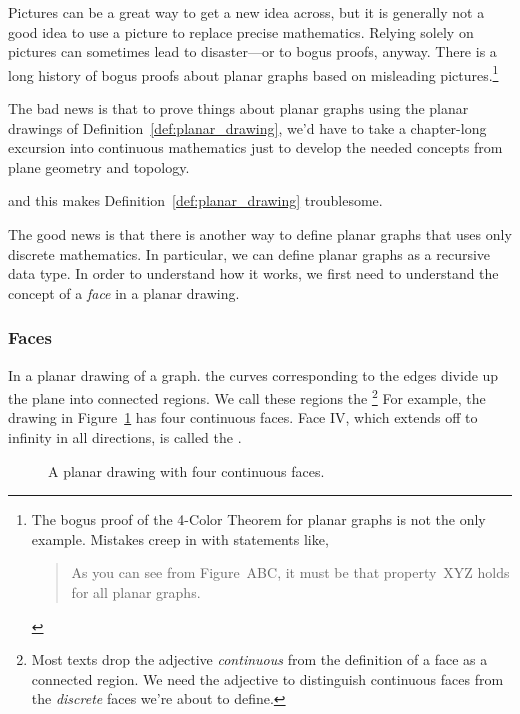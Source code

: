 Pictures can be a great way to get a new idea across, but it is generally
not a good idea to use a picture to replace precise mathematics.  Relying
solely on pictures can sometimes lead to disaster---or to bogus proofs,
anyway.  There is a long history of bogus proofs about planar graphs based
on misleading pictures.\footnote{The bogus proof of the
  4-Color Theorem for planar graphs is not the only example.  Mistakes
  creep in with statements like,
\begin{quote}
    As you can see from Figure~ABC, it must be that property~XYZ holds
    for all planar graphs.
\end{quote}}

The bad news is that to prove things about planar graphs using the planar
drawings of Definition~\ref{def:planar_drawing}, we'd have to take a chapter-long
excursion into continuous mathematics just to develop the needed concepts
from plane geometry and topology.
\begin{editingnotes} and this makes
  Definition~\ref{def:planar_drawing} troublesome.
\end{editingnotes}
The good news is that there is another way to define planar graphs that
uses only discrete mathematics.  In particular, we can define planar
graphs as a recursive data type.  In order to understand how it works, we
first need to understand the concept of a \emph{face} in a planar drawing.

\subsubsection{Faces}

In a planar drawing of a graph. the curves corresponding to the edges
divide up the plane into connected regions.  We call these regions the
\footnote{Most texts drop the adjective
  \emph{continuous} from the definition of a face as a connected region.
  We need the adjective to distinguish continuous faces from the
  \emph{discrete} faces we're about to define.}  For example, the drawing
in Figure~\ref{fig:continuous-faces} has four continuous faces.  Face IV,
which extends off to infinity in all directions, is called the
.

\begin{figure}


\caption{A planar drawing with four continuous faces.}
\label{fig:continuous-faces}
\end{figure}

